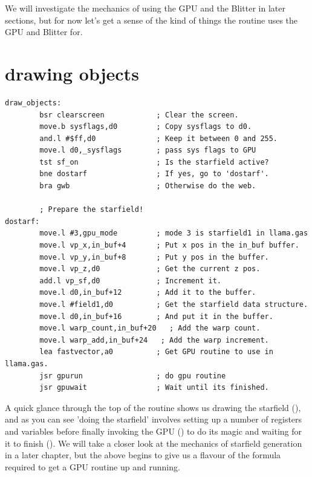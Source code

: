 We will investigate the mechanics of using the GPU and the Blitter in later sections, but for now let's get a
sense of the kind of things the  routine uses the GPU and Blitter for.

\section*{drawing objects}
\begin{lstlisting}[escapechar=\%]
draw_objects:
        bsr clearscreen            ; Clear the screen.
        move.b sysflags,d0         ; Copy sysflags to d0.
        and.l #$ff,d0              ; Keep it between 0 and 255.
        move.l d0,_sysflags        ; pass sys flags to GPU
        tst sf_on                  ; Is the starfield active?
        bne dostarf                ; If yes, go to 'dostarf'.
        bra gwb                    ; Otherwise do the web.
    
        ; Prepare the starfield!
dostarf:
        move.l #3,gpu_mode         ; mode 3 is starfield1 in llama.gas
        move.l vp_x,in_buf+4       ; Put x pos in the in_buf buffer.
        move.l vp_y,in_buf+8       ; Put y pos in the buffer.
        move.l vp_z,d0             ; Get the current z pos.
        add.l vp_sf,d0             ; Increment it.
        move.l d0,in_buf+12        ; Add it to the buffer.
        move.l #field1,d0          ; Get the starfield data structure.
        move.l d0,in_buf+16        ; And put it in the buffer.
        move.l warp_count,in_buf+20   ; Add the warp count.
        move.l warp_add,in_buf+24   ; Add the warp increment.
        lea fastvector,a0          ; Get GPU routine to use in llama.gas.
        jsr gpurun                 ; do gpu routine
        jsr gpuwait                ; Wait until its finished.
\end{lstlisting}

A quick glance through the top of the routine shows us drawing the starfield (),
and as you can see 'doing the starfield' involves setting up a number of registers and variables
before finally invoking the GPU () to do its magic and waiting for it to finish
(). We will take a closer look at the mechanics of starfield generation in a later
chapter, but the above begins to give us a flavour of the formula required to get a GPU routine up 
and running.

